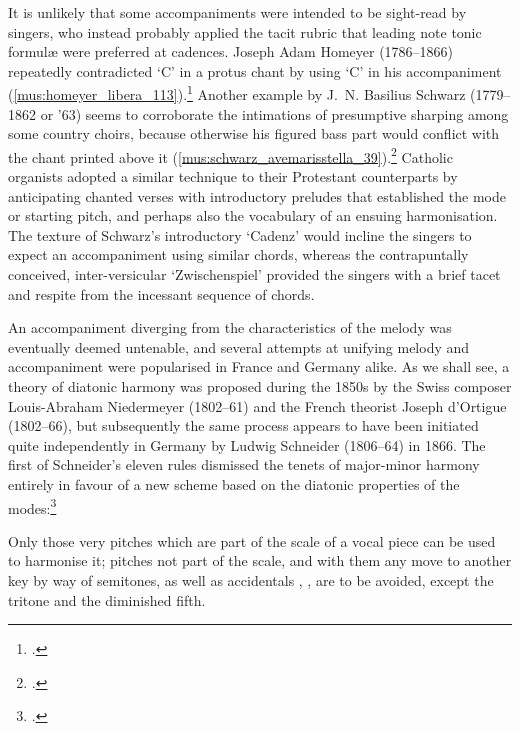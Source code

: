 It is unlikely that some accompaniments were intended to be sight-read by singers, who instead probably applied the tacit rubric that leading note \rightarrow{} tonic formulæ were preferred at cadences.
Joseph Adam Homeyer (1786--1866) repeatedly contradicted `C'\kern 1pt\natural{} in a protus chant by using `C'\kern 1pt\sharp{} in his accompaniment (\cref{mus:homeyer_libera_113}).\footcites[113]{HomeyerAltarundResponsoriengesang1846}[62--3]{WagenerBegleitunggregorianischenChorals1964}
Another example by J.~N. Basilius Schwarz (1779--1862 or '63) seems to corroborate the intimations of presumptive sharping among some country choirs, because otherwise his figured bass part would conflict with the chant printed above it (\cref{mus:schwarz_avemarisstella_39}).\footcite[There appear to be two undated editions of Schwarz's book, one published in landscape format in which the example is printed on p.~29, and the following published in portrait format:][39]{SchwarzChoralwieer}
Catholic organists adopted a similar technique to their Protestant counterparts by anticipating chanted verses with introductory preludes that established the mode or starting pitch, and perhaps also the vocabulary of an ensuing harmonisation.
The texture of Schwarz's introductory `Cadenz' would incline the singers to expect an accompaniment using similar chords, whereas the contrapuntally conceived, inter-versicular `Zwischenspiel' provided the singers with a brief tacet and respite from the incessant sequence of chords.

%
An accompaniment diverging from the characteristics of the melody was eventually deemed untenable, and several attempts at unifying melody and accompaniment were popularised in France and Germany alike.
%
As we shall see, a theory of diatonic harmony was proposed during the 1850s by the Swiss composer Louis-Abraham Niedermeyer (1802--61) and the French theorist Joseph d'Ortigue (1802--66), but subsequently the same process appears to have been initiated quite independently in Germany by Ludwig Schneider (1806--64) in 1866.
The first of Schneider's eleven rules dismissed the tenets of major-minor harmony entirely in favour of a new scheme based on the diatonic properties of the modes:\footcite[93]{BainHildegardBingenMusical2015}
%

  {\cites[pp.~iii--iv]{SchneiderGregorianischeChoralgesaengefuer1866}[98--9]{WagenerBegleitunggregorianischenChorals1964}}
{Only those very pitches which are part of the scale of a vocal piece can be used to harmonise it; pitches not part of the scale, and with them any move to another key by way of semitones, as well as accidentals {\normalfont \sharp{}}, {\normalfont \flat{}}, {\normalfont \natural{}} are to be avoided, except the tritone and the diminished fifth.}

